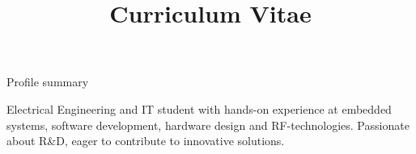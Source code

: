\documentclass[a4paper,skipsamekey,11pt,english]{curve}
\title{Curriculum Vitae}
\begin{document}
\makeheaders[c]
\vspace{-2.5em}

\begin{rubric}{Profile summary}
\vspace{0.2em}
\parbox{\textwidth}{
Electrical Engineering and IT student with hands-on experience at embedded systems, software development, hardware design and RF-technologies.
Passionate about R\&D, eager to contribute to innovative solutions.
}
\end{rubric}
\vspace{-0.5em}
\vspace{-1.1em}
\vspace{-1.1em}

    
    
    
    

\vspace{-0.9em}
\end{document}
